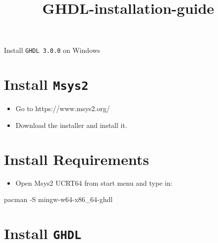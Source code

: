 \documentclass[11pt]{article}
\title{GHDL-installation-guide}
\providecommand{\tightlist}{%
      \setlength{\itemsep}{0pt}\setlength{\parskip}{0pt}}
\newenvironment{Shaded}{}{}
\newcommand{\NormalTok}[1]{{#1}}
\newcommand{\ExtensionTok}[1]{{#1}}
\begin{document}
    
    \maketitle
    
    

    
    \hypertarget{install-ghdl-3.0.0-on-windows}{%
{\Huge {\texorpdfstring{Install \texttt{GHDL\ 3.0.0} on
Windows}{Install GHDL 3.0.0 on Windows}}\label{install-ghdl-3.0.0-on-windows}}}

    \hypertarget{install-msys2}{%
\section{\texorpdfstring{Install
\texttt{Msys2}}{Install Msys2}}\label{install-msys2}}

\begin{itemize}
\tightlist
\item
  Go to https://www.msys2.org/
\item
  Download the installer and install it.
\end{itemize}

    \hypertarget{install-requirements}{%
\section{Install Requirements}\label{install-requirements}}

\begin{itemize}
\tightlist
\item
  Open Msys2 UCRT64 from start menu and type in:
\end{itemize}

\begin{Shaded}
\begin{Highlighting}[]
\ExtensionTok{pacman}\NormalTok{ {-}S mingw{-}w64{-}x86\_64{-}ghdl}
\end{Highlighting}
\end{Shaded}

    \hypertarget{install-ghdl}{%
\section{\texorpdfstring{Install
\texttt{GHDL}}{Install GHDL}}\label{install-ghdl}}
\end{document}
